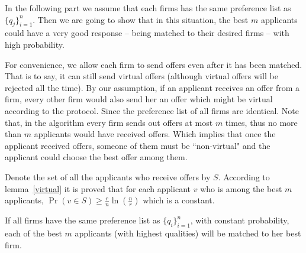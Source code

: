 In the following part we assume that each firms has the same preference
list as $\{q_j\}_{i=1}^{n}$.
Then we are going to show that in this situation, the best $m$ applicants
could have a very good response -- being matched to their desired firms 
-- with high probability.

For convenience, we allow each firm to send offers even after it has been matched.
That is to say, it can still send virtual offers
(although virtual offers will be rejected all the time).
By our assumption, if an applicant receives an offer from a firm, 
every other firm would also send her an offer which might be virtual
according to the protocol. Since the preference list of all firms are 
identical. Note that, in the algorithm every firm sends out offers 
at most $m$ times, thus no more than $m$ applicants would have received 
offers. Which implies that once the applicant received offers, 
someone of them must be ``non-virtual" and the applicant could choose
the best offer among them.

Denote the set of all the applicants who receive offers by $S$. According to lemma~\ref{virtual} it is
proved
that for each applicant $v$ who is among the best $m$ applicants,
$\Pr(v \in S) \ge \frac{r}{n} \ln (\frac{n}{r})$ which
is a constant.

\begin{lemma} \label{finallem}
    If all firms have the same preference list as $\{q_i\}_{i=1}^{n}$,
    with constant probability,
    each of the best $m$ applicants (with highest qualities) will be matched to her best firm.
\end{lemma}

